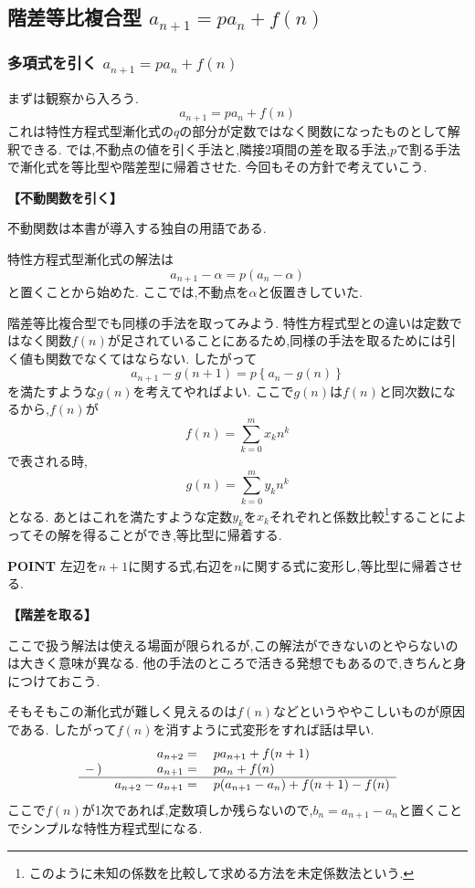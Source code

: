 
\subsection{\texorpdfstring{階差等比複合型  $\displaystyle a_{n+1}=pa_n+f(n)$}{階差等比複合型}}\label{節：階差等比複合型}
\subsubsection{\texorpdfstring{多項式を引く  $\displaystyle a_{n+1}=pa_n+f(n)$}{多項式を引く}}
まずは観察から入ろう.
\[
  a_{n+1}=pa_n+f(n)
\]
これは特性方程式型漸化式の$q$の部分が定数ではなく関数になったものとして解釈できる.
では,不動点の値を引く手法と,隣接2項間の差を取る手法,$p$で割る手法で漸化式を等比型や階差型に帰着させた.
今回もその方針で考えていこう.

\noindent \textbf{【不動関数を引く】}

不動関数は本書が導入する独自の用語である.

特性方程式型漸化式の解法は
\[
  a_{n+1}-\alpha=p(a_n-\alpha)
\]
と置くことから始めた.
ここでは,不動点を$\alpha$と仮置きしていた.

階差等比複合型でも同様の手法を取ってみよう.
特性方程式型との違いは定数ではなく関数$f(n)$が足されていることにあるため,同様の手法を取るためには引く値も関数でなくてはならない.
したがって
\[
  a_{n+1}-g(n+1)=p\left\{a_n-g(n)\right\}
\]
を満たすような$g(n)$を考えてやればよい.
ここで$g(n)$は$f(n)$と同次数になるから,$f(n)$が
\[
  f(n)=\sum_{k=0}^{m} x_kn^k
\]
で表される時,
\[
  g(n)=\sum_{k=0}^{m} y_kn^k
\]
となる.
あとはこれを満たすような定数$y_k$を$x_k$それぞれと係数比較\footnote{このように未知の係数を比較して求める方法を未定係数法という.}することによってその解を得ることができ,等比型に帰着する.

\begin{bookpoint}
  \textbf{POINT}
  左辺を$n+1$に関する式,右辺を$n$に関する式に変形し,等比型に帰着させる.
\end{bookpoint}

\noindent \textbf{【階差を取る】}

ここで扱う解法は使える場面が限られるが,この解法ができないのとやらないのは大きく意味が異なる.
他の手法のところで活きる発想でもあるので,きちんと身につけておこう.

そもそもこの漸化式が難しく見えるのは$f(n)$などというややこしいものが原因である.
したがって$f(n)$を消すように式変形をすれば話は早い.
  \[
    \begin{array}{rrl}
      &a_{n+2}={}&pa_{n+1}+f(n+1)\\
      -\,)&a_{n+1}={}&pa_n+f(n)\\ \hline
      &a_{n+2}-a_{n+1}={}&p(a_{n+1}-a_n)+f(n+1)-f(n)
    \end{array}
  \]
  ここで$f(n)$が1次であれば,定数項しか残らないので,$b_n=a_{n+1}-a_n$と置くことでシンプルな特性方程式型になる.
  
